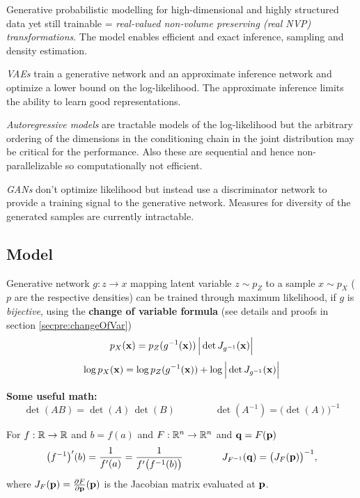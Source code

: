 Generative probabilistic modelling for high-dimensional and highly structured data yet still trainable = \emph{real-valued non-volume preserving (real NVP) transformations}.
The model enables efficient and exact inference, sampling and density estimation.

\emph{VAEs} train a generative network and an approximate inference network and optimize a lower bound on the log-likelihood. The approximate inference limits the ability to learn good representations.

\emph{Autoregressive models} are tractable models of the log-likelihood but the arbitrary ordering of the dimensions in the conditioning chain in the joint distribution may be critical for the performance. Also these are sequential and hence non-parallelizable so computationally not efficient.

\emph{GANs} don't optimize likelihood but instead use a discriminator network to provide a training signal to the generative network. Measures for diversity of the generated samples are currently intractable.

\subsection{Model}

Generative network $g : z \to x$ mapping latent variable $z \sim p_Z$ to a sample $x \sim p_X$ ($p$ are the respective densities) can be trained through maximum likelihood, if $g$ is \emph{bijective}, using the \textbf{change of variable formula} (see details and proofs in section \ref{secpre:changeOfVar})
\begin{equation}
p_X(\mathbf{x}) = p_Z(g^{-1}(\mathbf{x})) \,\Big\lvert \det J_{g^{-1}}(\mathbf{x}) \Big\rvert
\end{equation}
\begin{equation}
\log p_X(\mathbf{x}) = \log p_Z(g^{-1}(\mathbf{x})) + \log \Big\lvert \det J_{g^{-1}}(\mathbf{x}) \Big\rvert
\end{equation}

\begin{notebox}
\textbf{Some useful math:}
\begin{equation}
\det(AB) = \det(A) \, \det(B) \qquad \qquad \det(A^{-1}) = \big(\det(A) \big)^{-1}
\end{equation}

For $f: \mathbb{R} \to \mathbb{R}$ and $b = f(a)$ and $F : \mathbb{R}^n \to \mathbb{R}^n$ and $\mathbf{q} = F(\mathbf{p})$
\begin{equation}
\big(f^{-1}\big)'(b) = \frac{1}{f'(a)} = \frac{1}{f'\big(f^{-1}(b)\big)}
\qquad \qquad
J_{F^{-1}}(\mathbf{q}) = \big(J_{F}(\mathbf{p})\big)^{-1},
\end{equation}
where $J_{F}(\mathbf{p}) = \frac{\partial F}{\partial \mathbf{p}}(\mathbf{p})$ is the Jacobian matrix evaluated at $\mathbf{p}$.
\end{notebox}


